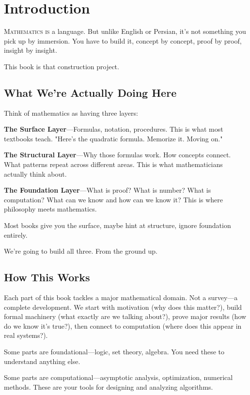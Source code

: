 \chapter*{Introduction}

\lettrine{M}{athematics is} a language. But unlike English or Persian, it's not something you pick up by immersion. You have to build it, concept by concept, proof by proof, insight by insight.

This book is that construction project.

\section*{What We're Actually Doing Here}

Think of mathematics as having three layers:

\textbf{The Surface Layer}—Formulas, notation, procedures. This is what most textbooks teach. "Here's the quadratic formula. Memorize it. Moving on."

\textbf{The Structural Layer}—Why those formulas work. How concepts connect. What patterns repeat across different areas. This is what mathematicians actually think about.

\textbf{The Foundation Layer}—What is proof? What is number? What is computation? What can we know and how can we know it? This is where philosophy meets mathematics.

Most books give you the surface, maybe hint at structure, ignore foundation entirely.

We're going to build all three. From the ground up.

\section*{How This Works}

Each part of this book tackles a major mathematical domain. Not a survey—a complete development. We start with motivation (why does this matter?), build formal machinery (what exactly are we talking about?), prove major results (how do we know it's true?), then connect to computation (where does this appear in real systems?).

Some parts are foundational—logic, set theory, algebra. You need these to understand anything else.

Some parts are computational—asymptotic analysis, optimization, numerical methods. These are your tools for designing and analyzing algorithms.

